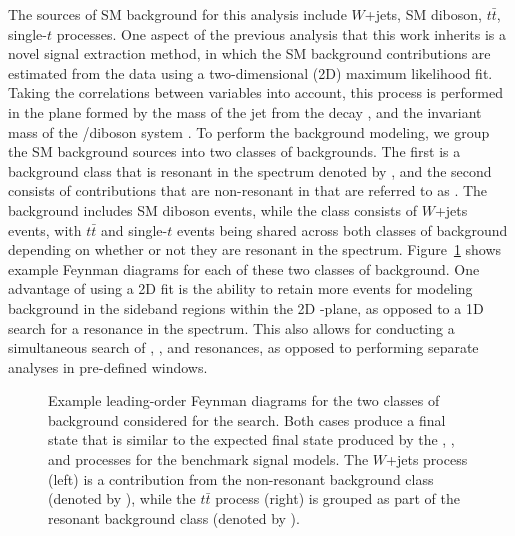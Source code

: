 The sources of SM background for this analysis include $W$+jets, SM diboson, $t\bar{t}$, single-$t$ processes.
One aspect of the previous analysis that this work inherits is a novel signal extraction method, in which the SM background contributions are estimated from the data using a two-dimensional (2D) maximum likelihood fit.
Taking the correlations between variables into account, this process is performed in the plane formed by the mass of the jet from the \VorH decay \MJ, and the invariant mass of the \WV/\WH diboson system \MVV.
To perform the background modeling, we group the SM background sources into two classes of backgrounds.
The first is a background class that is resonant in the \MJ spectrum denoted by \WVt, and the second consists of contributions that are non-resonant in \MJ that are referred to as \Wjets.
The \WVt background includes SM diboson events, while the \Wjets class consists of $W$+jets events, with $t\bar{t}$ and single-$t$ events being shared across both classes of background depending on whether or not they are resonant in the \MJ spectrum.
Figure~\ref{fig:bkgFeynman} shows example Feynman diagrams for each of these two classes of background.
One advantage of using a 2D fit is the ability to retain more events for modeling background in the sideband regions within the 2D \MVV-\MJ plane, as opposed to a 1D search for a resonance in the \MVV spectrum.
This also allows for conducting a simultaneous search of \WW, \WZ, and \WH resonances, as opposed to performing separate analyses in pre-defined \MJ windows.

\begin{figure}[htbp]
  \centering
  
  \caption{
    Example leading-order Feynman diagrams for the two classes of background considered for the search.
    Both cases produce a final state that is similar to the expected final state produced by the \ggF, \DY, and \VBF processes for the benchmark signal models.
    The $W$+jets process (left) is a contribution from the non-resonant background class (denoted by \Wjets), while the $t\bar{t}$ process (right) is grouped as part of the resonant background class (denoted by \WVt).
  }
  \label{fig:bkgFeynman}
\end{figure}

